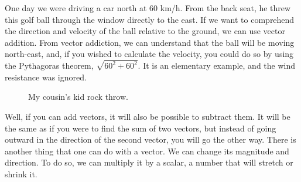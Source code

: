 \documentclass[600paper, 11pt,twoside,openany]{kdp}
\begin{document}
\indent One day we were driving a car north at 60 km/h. From the back seat, he threw this golf ball through the window directly to the east. If we want to comprehend the direction and velocity of the ball relative to the ground, we can use vector addition. From vector addiction, we can understand that the ball will be moving north-east, and, if you wished to calculate the velocity, you could do so by using the Pythagoras theorem, $\sqrt{60^2 + 60^2}$. It is an elementary example, and the wind resistance was ignored.
\newpage
\begin{figure}[h!]
\begin{center}
\end{center}
\caption{My cousin's kid rock throw.}\label{fig:exampleVectorAddition}
\end{figure}
Well, if you can add vectors, it will also be possible to subtract them. It will be the same as if you were to find the sum of two vectors, but instead of going outward in the direction of the second vector, you will go the other way. There is another thing that one can do with a vector. We can change its magnitude and direction. To do so, we can multiply it by a scalar, a number that will stretch or shrink it.
\end{document}
